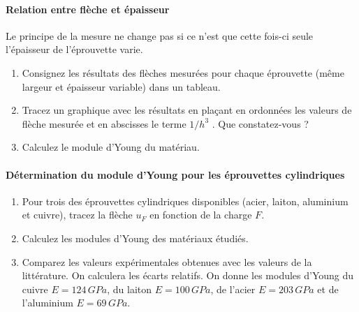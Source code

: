 \documentclass[lecture.tex]{subfiles}
\begin{document}
\paragraph*{Relation entre flèche et épaisseur}
Le principe de la mesure ne change pas si ce n'est que cette fois-ci seule l'épaisseur de l'éprouvette varie.
\begin{enumerate}[resume]
\item Consignez les résultats des flèches mesurées pour chaque éprouvette (même largeur et épaisseur variable) dans un tableau.
\item Tracez un graphique avec les résultats en plaçant en ordonnées les valeurs de flèche mesurée et en abscisses le terme $1/h^3$ .  Que constatez-vous ?
\item Calculez le module d'Young du matériau.
\end{enumerate}

\paragraph*{Détermination du module d'Young pour les éprouvettes cylindriques}
\begin{enumerate}[resume]
\item Pour trois des éprouvettes cylindriques disponibles (acier, laiton, aluminium et cuivre), tracez la flèche $u_F$ en fonction de la charge $F$.
\item Calculez les modules d'Young des matériaux étudiés.
\item Comparez les valeurs expérimentales obtenues avec les valeurs de la littérature. On calculera les écarts relatifs. On donne les modules d'Young du cuivre $E=124\,GPa$, du laiton $E=100\,GPa$, de l'acier $E=203\, GPa$ et de l'aluminium $E=69\,GPa$.
\end{enumerate}
\end{document}
